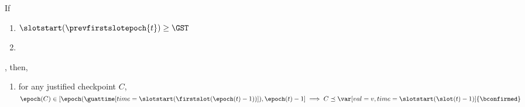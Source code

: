 \documentclass{article}
\begin{document}
\begin{lemma}\label{lem:gj-prec-prev-confirmed-at-start-of-epoch}
    If
    \begin{enumerate}
        \item $\slotstart(\prevfirstslotepoch{t})\geq \GST$
        \item {}
    \end{enumerate},
    then,  %
    \begin{enumerate}
        \item for any justified checkpoint $C$, $\epoch(C) \in [\epoch(\guattime[time=\slotstart(\firstslot(\epoch(t)-1))]),\epoch(t)-1] \implies C  \preceq \var[val=v,time=\slotstart(\slot(t)-1)]{\bconfirmed}$
    \end{enumerate}
\end{lemma}
\end{document}
